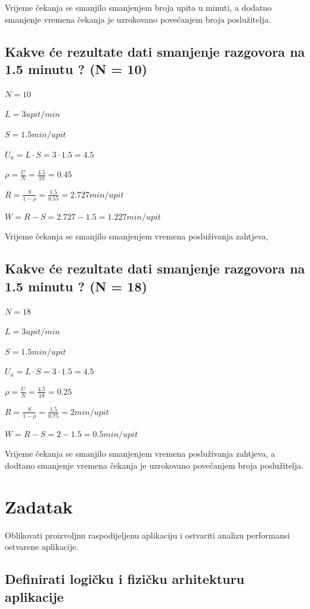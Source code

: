 \documentclass[11pt]{article}
\begin{document}
Vrijeme čekanja se smanjilo smanjenjem broja upita u minuti, a dodatno smanjenje vremena čekanja je uzrokovano povećanjem broja poslužitelja.

\subsection{Kakve će rezultate dati smanjenje razgovora na 1.5 minutu ? (N = 10)}

$N =10$

$L = 3 upit / min$

$S = 1.5 min / upit$

$U_a = L \cdot S = 3 \cdot 1.5 = 4.5$

$\rho = \frac{U}{N} = \frac{4.5}{10} = 0.45$

$R = \frac{S}{1 - \rho} = \frac{1.5}{0.55} = 2.727 min / upit$

$W = R - S = 2.727 - 1.5 = 1.227 min / upit$

Vrijeme čekanja se smanjilo smanjenjem vremena posluživanja zahtjeva,

\subsection{Kakve će rezultate dati smanjenje razgovora na 1.5 minutu ? (N = 18)}

$N =18$

$L = 3 upit / min$

$S = 1.5 min / upit$

$U_a = L \cdot S = 3 \cdot 1.5 = 4.5$

$\rho = \frac{U}{N} = \frac{4.5}{18} = 0.25$

$R = \frac{S}{1 - \rho} = \frac{1.5}{0.75} = 2 min / upit$

$W = R - S = 2 - 1.5 = 0.5 min / upit$

Vrijeme čekanja se smanjilo smanjenjem vremena posluživanja zahtjeva, a dodtano smanjenje vremena čekanja je uzrokovano povečanjem broja poslužitelja.

\section{Zadatak}
Oblikovati proizvoljnu raspodijeljenu aplikaciju i ostvariti analizu performansi ostvarene aplikacije.

\newpage

\subsection{Definirati logičku i fizičku arhitekturu aplikacije}
\end{document}
